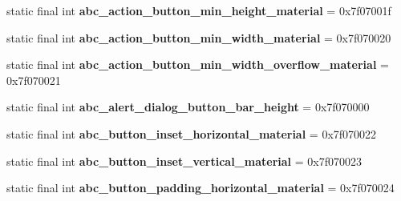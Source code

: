 \begin{DoxyCompactItemize}
\item 
\hypertarget{classandroid_1_1support_1_1v7_1_1appcompat_1_1_r_1_1dimen_a371d25b458b3088905b862916bde0dcd}{}static final int {\bfseries abc\+\_\+action\+\_\+button\+\_\+min\+\_\+height\+\_\+material} = 0x7f07001f\label{classandroid_1_1support_1_1v7_1_1appcompat_1_1_r_1_1dimen_a371d25b458b3088905b862916bde0dcd}

\item 
\hypertarget{classandroid_1_1support_1_1v7_1_1appcompat_1_1_r_1_1dimen_a4c445ec74d6c280421733fc114f2b3a3}{}static final int {\bfseries abc\+\_\+action\+\_\+button\+\_\+min\+\_\+width\+\_\+material} = 0x7f070020\label{classandroid_1_1support_1_1v7_1_1appcompat_1_1_r_1_1dimen_a4c445ec74d6c280421733fc114f2b3a3}

\item 
\hypertarget{classandroid_1_1support_1_1v7_1_1appcompat_1_1_r_1_1dimen_a6b22c0a5d1378b0cbb2175d8c950d84d}{}static final int {\bfseries abc\+\_\+action\+\_\+button\+\_\+min\+\_\+width\+\_\+overflow\+\_\+material} = 0x7f070021\label{classandroid_1_1support_1_1v7_1_1appcompat_1_1_r_1_1dimen_a6b22c0a5d1378b0cbb2175d8c950d84d}

\item 
\hypertarget{classandroid_1_1support_1_1v7_1_1appcompat_1_1_r_1_1dimen_a9b3e9a1fbd18f79de50390bef3db6a50}{}static final int {\bfseries abc\+\_\+alert\+\_\+dialog\+\_\+button\+\_\+bar\+\_\+height} = 0x7f070000\label{classandroid_1_1support_1_1v7_1_1appcompat_1_1_r_1_1dimen_a9b3e9a1fbd18f79de50390bef3db6a50}

\item 
\hypertarget{classandroid_1_1support_1_1v7_1_1appcompat_1_1_r_1_1dimen_ac53d3135eb3d115bf3286735276dd240}{}static final int {\bfseries abc\+\_\+button\+\_\+inset\+\_\+horizontal\+\_\+material} = 0x7f070022\label{classandroid_1_1support_1_1v7_1_1appcompat_1_1_r_1_1dimen_ac53d3135eb3d115bf3286735276dd240}

\item 
\hypertarget{classandroid_1_1support_1_1v7_1_1appcompat_1_1_r_1_1dimen_a6536a246e0a31fd4ba7f4181e955dabe}{}static final int {\bfseries abc\+\_\+button\+\_\+inset\+\_\+vertical\+\_\+material} = 0x7f070023\label{classandroid_1_1support_1_1v7_1_1appcompat_1_1_r_1_1dimen_a6536a246e0a31fd4ba7f4181e955dabe}

\item 
\hypertarget{classandroid_1_1support_1_1v7_1_1appcompat_1_1_r_1_1dimen_aa2efa92063f2ff2083d5ed60dcd38692}{}static final int {\bfseries abc\+\_\+button\+\_\+padding\+\_\+horizontal\+\_\+material} = 0x7f070024\label{classandroid_1_1support_1_1v7_1_1appcompat_1_1_r_1_1dimen_aa2efa92063f2ff2083d5ed60dcd38692}


\end{DoxyCompactItemize}
